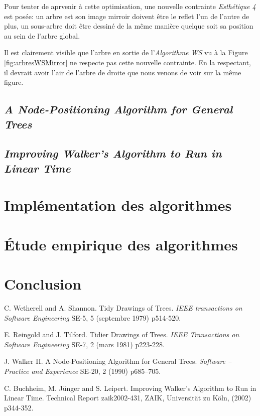 \documentclass{article}
\begin{document}
  Pour tenter de aprvenir à cette optimisation, une nouvelle contrainte \emph{Esthétique 4} est posée: un arbre est son image mirroir doivent être le reflet l'un de l'autre de plus, un sous-arbre doit être dessiné de la même manière quelque soit sa position au sein de l'arbre global.

  Il est clairement visible que l'arbre en sortie de l'\emph{Algorithme WS} vu à la Figure \ref{fig:arbresWSMirror} ne respecte pas cette nouvelle contrainte. En la respectant, il devrait avoir l'air de l'arbre de droite que nous venons de voir sur la même figure.
   




  \subsection{\emph{A Node-Positioning Algorithm for General Trees}}
  \subsection{\emph{Improving Walker’s Algorithm to Run in Linear Time}}


\newpage
\section{Implémentation des algorithmes}

\newpage
\section{Étude empirique des algorithmes}

\newpage
\section{Conclusion}




\newpage
\medskip

\begin{thebibliography}{10}

C. Wetherell and A. Shannon. Tidy Drawings of Trees. \textit{IEEE transactions on Software Engineering} SE-5, 5 (septembre 1979) p514-520.

E. Reingold and J. Tilford. Tidier Drawings of Trees. \textit{IEEE Transactions on Software Engineering} SE-7, 2 (mars 1981) p223-228.

J. Walker II. A Node-Positioning Algorithm for General Trees. \textit{Software – Practice and Experience} SE-20, 2 (1990) p685–705.

C. Buchheim, M. Jünger and S. Leipert. Improving Walker’s Algorithm to Run in Linear Time. Technical Report zaik2002-431, ZAIK, Universität zu Köln, (2002) p344-352.

\end{thebibliography}
\end{document}
